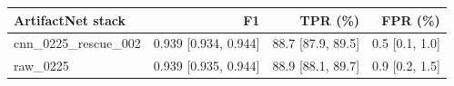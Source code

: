 \begin{tabular}{lrrr}
\toprule
ArtifactNet stack & F1 & TPR (\%) & FPR (\%) \\
\midrule
cnn\_0225\_rescue\_002 & 0.939 [0.934, 0.944] & 88.7 [87.9, 89.5] & 0.5 [0.1, 1.0] \\
raw\_0225 & 0.939 [0.935, 0.944] & 88.9 [88.1, 89.7] & 0.9 [0.2, 1.5] \\
\bottomrule
\end{tabular}
